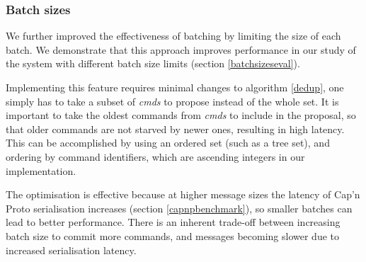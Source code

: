 \subsubsection{Batch sizes} \label{batchsizes}
We further improved the effectiveness of batching by limiting the size of each batch. We demonstrate that this approach improves performance in our study of the system with different batch size limits (section \ref{batchsizeseval}).

Implementing this feature requires minimal changes to algorithm \ref{dedup}, one simply has to take a subset of \textit{cmds} to propose instead of the whole set. It is important to take the oldest commands from \textit{cmds} to include in the proposal, so that older commands are not starved by newer ones, resulting in high latency. This can be accomplished by using an ordered set (such as a tree set), and ordering by command identifiers, which are ascending integers in our implementation.

The optimisation is effective because at higher message sizes the latency of Cap'n Proto serialisation increases (section \ref{capnpbenchmark}), so smaller batches can lead to better performance. There is an inherent trade-off between increasing batch size to commit more commands, and messages becoming slower due to increased serialisation latency.




